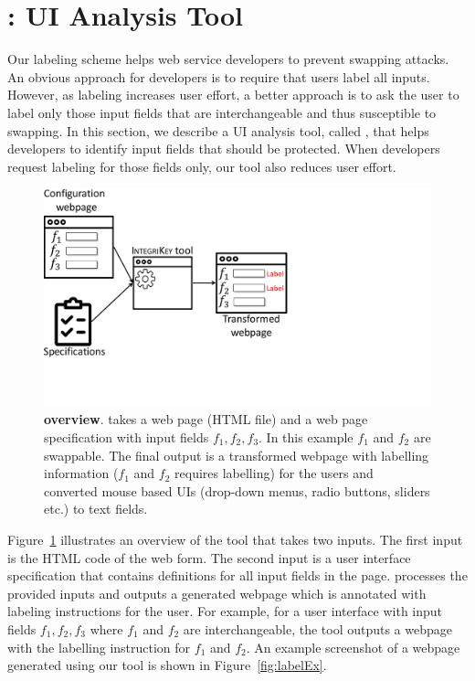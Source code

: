 \section{\tool: UI Analysis Tool}
\label{sec:integriTool}

Our labeling scheme helps web service developers to prevent swapping attacks. An obvious approach for developers is to require that users label all inputs. However, as labeling increases user effort, a better approach is to ask the user to label only those input fields that are interchangeable and thus susceptible to swapping. In this section, we describe a UI analysis tool, called \tool, that helps developers to identify input fields that should be protected. When developers request labeling for those fields only, our tool also reduces user effort.

\begin{figure}[t]
 \centering
 \includegraphics[trim={0 2.3cm 12cm 0},clip,width=0.6\linewidth]{chapters/IntegriKey/images/ServerSideTool_revised_2.pdf}
 \caption[\tool overview]{\textbf{\tool overview}. \tool takes a web page (HTML file) and a web page specification with input fields $f_1, f_2, f_3$. In this example $f_1$ and $f_2$ are swappable. The final output is a transformed webpage with labelling information ($f_1$ and $f_2$ requires labelling) for the users and converted mouse based UIs (drop-down menus, radio buttons, sliders etc.) to text fields. 
 }
 \label{fig:tool}
\end{figure}

Figure~\ref{fig:tool} illustrates an overview of the tool that takes two inputs. The first input is the HTML code of the web form. The second input is a user interface specification that contains definitions for all input fields in the page. \tool processes the provided inputs and outputs a generated webpage which is annotated with labeling instructions for the user. For example, for a user interface with input fields $f_1, f_2, f_3$ where $f_1$ and $f_2$ are interchangeable, the tool outputs a webpage with the labelling instruction for $f_1$ and $f_2$. An example screenshot of a webpage generated using our tool is shown in Figure~\ref{fig:labelEx}.
 

